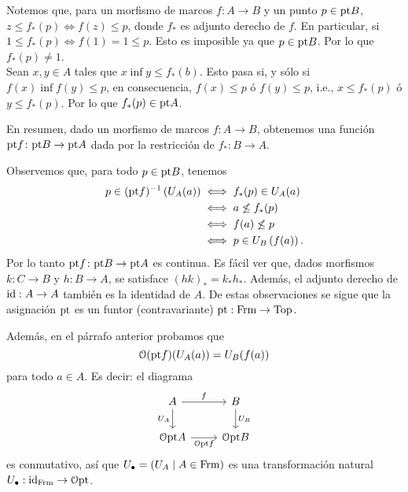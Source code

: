 Notemos que, para un morfismo de marcos $f\colon A\to B$ y un punto $p\in \mathrm{pt} B$, $z\leq f_\ast (p)\iff f(z)\leq p$, donde $f_\ast$ es adjunto derecho de $f$. En particular, si $1\leq f_\ast(p)\iff f(1)=1\leq p$. Esto es imposible ya que $p\in \mathrm{pt} B$. Por lo que $f_\ast(p)\neq 1$.\\
Sean $x,y\in A$ tales que $x\inf y\leq f_\ast(b)$. Esto pasa si, y sólo si $f(x)\inf f(y)\leq p$, en consecuencia, $f(x)\leq p$ ó $f(y)\leq p$, i.e., $x\leq f_\ast (p)$ ó $y\leq f_\ast (p)$. Por lo que $f_\ast (p)\in \mathrm{pt} A$.\par 
En resumen, dado un morfismo de marcos $f\colon A\to B$, obtenemos una función $\mathrm{pt} f \colon \mathrm{pt} B\to \mathrm{pt} A$ dada por la restricción
de $f_*:B\to A$.\par
Observemos que, para todo $p\in \mathcal{\mathrm{pt}} B$, tenemos
\begin{align*}
    p\in (\mathrm{pt} f)^{-1} \left(U_A(a)\right)&\iff f_\ast (p)\in U_A(a)\\
    &\iff a\not\leq f_\ast (p)\\
    &\iff f(a)\not\leq p\\
    &\iff p\in U_B\left(f(a)\right).
\end{align*}
Por lo tanto $\mathrm{pt} f\colon \mathrm{pt} B\to \mathrm{pt} A$ es continua.
Es fácil ver que, dados morfismos $k:C\to B$ y $h:B\to A$,
se satisface $(hk)_*=k_*h_*$.
Además, el adjunto derecho de $\mathrm{id}:A\to A$ también es la identidad
de $A$.
De estas observaciones se sigue que la asignación $\mathrm{pt}$
es un funtor (contravariante) $\mathrm{pt}:\mathrm{Frm}\to\mathrm{Top}$.

Además, en el párrafo anterior probamos que
\[
    \mathcal{O}(\mathrm{pt} f)(U_A(a)) = U_B(f(a))
\]
para todo $a\in A$.
Es decir: el diagrama
\[
    \begin{tikzcd}
        A \ar[r,"f"] \ar[d,"U_A"'] & B \ar[d,"U_B"] \\
        \cal O\pt A \ar[r,"\cal O\pt f"'] & \cal O\pt B
    \end{tikzcd}
\]
es conmutativo, así que $U_\bullet=(U_A\mid A\in\mathrm{Frm})$
es una transformación
natural $U_\bullet:\mathrm{id}_{\mathrm{Frm}}\to\mathcal{O}\mathrm{pt}$.

